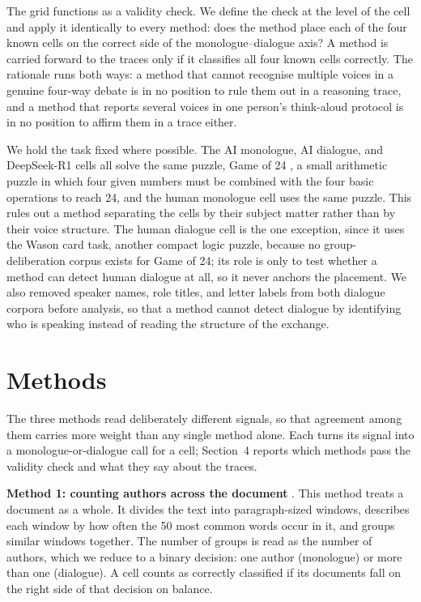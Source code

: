 \documentclass[10pt,twocolumn]{article}
\begin{document}
The grid functions as a validity check. We define the check at the level of the cell and apply it
identically to every method: does the method place each of the four known cells on the correct side of
the monologue--dialogue axis? A method is carried forward to the traces only if it classifies all four
known cells correctly. The rationale runs both ways: a method that cannot recognise multiple voices in
a genuine four-way debate is in no position to rule them out in a reasoning trace, and a method that
reports several voices in one person's think-aloud protocol is in no position to affirm them in a
trace either.

We hold the task fixed where possible. The AI monologue, AI dialogue, and DeepSeek-R1 cells all solve
the same puzzle, Game of 24 \cite{yao2023}, a small arithmetic puzzle in which four given numbers must
be combined with the four basic operations to reach 24, and the human monologue cell uses the same
puzzle. This rules out a method separating the cells by their subject matter rather than by their
voice structure. The human dialogue cell is the one exception, since it uses the Wason card task,
another compact logic puzzle, because no group-deliberation corpus exists for Game of 24; its role is
only to test whether a method can detect human dialogue at all, so it never anchors the placement. We
also removed speaker names, role titles, and letter labels from both dialogue corpora before analysis,
so that a method cannot detect dialogue by identifying who is speaking instead of reading the
structure of the exchange.

\section{Methods}
The three methods read deliberately different signals, so that agreement among them carries more
weight than any single method alone. Each turns its signal into a monologue-or-dialogue call for a
cell; Section~4 reports which methods pass the validity check and what they say about the traces.

\textbf{Method 1: counting authors across the document} \cite{nath2019}. This method treats a
document as a whole. It divides the text into paragraph-sized windows, describes each window by how
often the 50 most common words occur in it, and groups similar windows together. The number of groups
is read as the number of authors, which we reduce to a binary decision: one author (monologue) or more
than one (dialogue). A cell counts as correctly classified if its documents fall on the right side of
that decision on balance.
\end{document}
